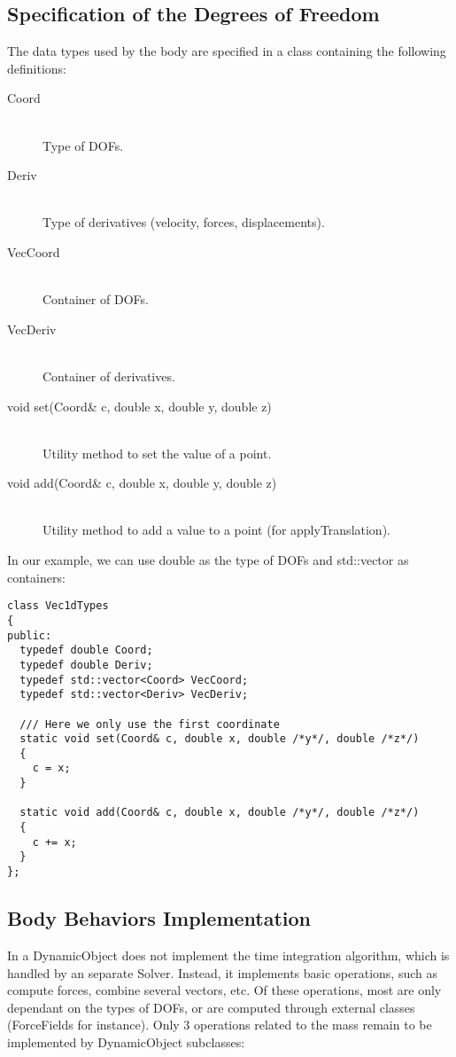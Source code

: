 \subsection{Specification of the Degrees of Freedom}\label{sec:DOF}

The data types used by the body are specified in a class containing the following definitions:

\begin{description}
\item[Coord]~\\
 Type of DOFs.
\item[Deriv]~\\
 Type of derivatives (velocity, forces, displacements).
\item[VecCoord]~\\
 Container of DOFs.
\item[VecDeriv]~\\
 Container of derivatives.
\item[void set(Coord\& c, double x, double y, double z)]~\\
 Utility method to set the value of a point.
\item[void add(Coord\& c, double x, double y, double z)]~\\
 Utility method to add a value to a point (for applyTranslation).

\end{description}

In our example, we can use double as the type of DOFs and std::vector as containers:

\begin{verbatim}
class Vec1dTypes
{
public:
  typedef double Coord;
  typedef double Deriv;
  typedef std::vector<Coord> VecCoord;
  typedef std::vector<Deriv> VecDeriv;
  
  /// Here we only use the first coordinate
  static void set(Coord& c, double x, double /*y*/, double /*z*/)
  {
    c = x;
  }
  
  static void add(Coord& c, double x, double /*y*/, double /*z*/)
  {
    c += x;
  }
};
\end{verbatim}

\subsection{Body Behaviors Implementation}

In \sofa{} a DynamicObject does not implement the time integration algorithm, which is handled by an separate Solver. Instead, it implements basic operations, such as compute forces, combine several vectors, etc. Of these operations, most are only dependant on the types of DOFs, or are computed through external classes (ForceFields for instance). Only 3 operations related to the mass remain to be implemented by DynamicObject subclasses:

